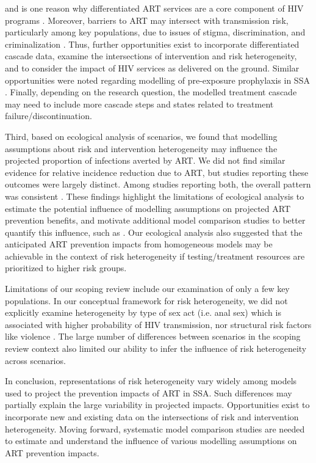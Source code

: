 and is one reason why differentiated ART services are a core component of HIV programs
\cite{Chikwari2018,Ehrenkranz2019}.
Moreover, barriers to ART may intersect with transmission risk, particularly among key populations,
due to issues of stigma, discrimination, and criminalization \cite{Ortblad2019,Baral2019}.
Thus, further opportunities exist to incorporate differentiated cascade data,
examine the intersections of intervention and risk heterogeneity, and
to consider the impact of HIV services as delivered on the ground.
Similar opportunities were noted regarding modelling of pre-exposure prophylaxis in SSA \cite{Case2019}.
Finally, depending on the research question, the modelled treatment cascade may need
to include more cascade steps and states related to treatment failure/discontinuation.
\par
Third, based on ecological analysis of scenarios, we found that
modelling assumptions about risk and intervention heterogeneity
may influence the projected proportion of infections averted by ART.
We did not find similar evidence for relative incidence reduction due to ART,
but studies reporting these outcomes were largely distinct.
Among studies reporting both, the overall pattern was consistent
\cite{Salomon2005,Abbas2006,Pretorius2010,Nichols2014,Barnighausen2016,Maheu-Giroux2017,Akudibillah2018}.
These findings highlight the limitations of ecological analysis to estimate
the potential influence of modelling assumptions on projected ART prevention benefits,
and motivate additional model comparison studies to better quantify this influence,
such as \cite{Dodd2010,Hontelez2013}.
Our ecological analysis also suggested that the anticipated ART prevention impacts from homogeneous models
may be achievable in the context of risk heterogeneity
if testing/treatment resources are prioritized to higher risk groups.
\par
Limitations of our scoping review include our examination of only a few key populations.
In our conceptual framework for risk heterogeneity, we did not explicitly examine heterogeneity
by type of sex act (i.e. anal sex) which is associated with higher probability of HIV transmission,
nor structural risk factors like violence \cite{Silverman2011,Baggaley2013}.
The large number of differences between scenarios in the scoping review context
also limited our ability to infer the influence of risk heterogeneity across scenarios.
\par
In conclusion, representations of risk heterogeneity vary widely
among models used to project the prevention impacts of ART in SSA.
Such differences may partially explain the large variability in projected impacts.
Opportunities exist to incorporate new and existing data on
the intersections of risk and intervention heterogeneity.
Moving forward, systematic model comparison studies are needed to
estimate and understand the influence of various modelling assumptions on ART prevention impacts.
